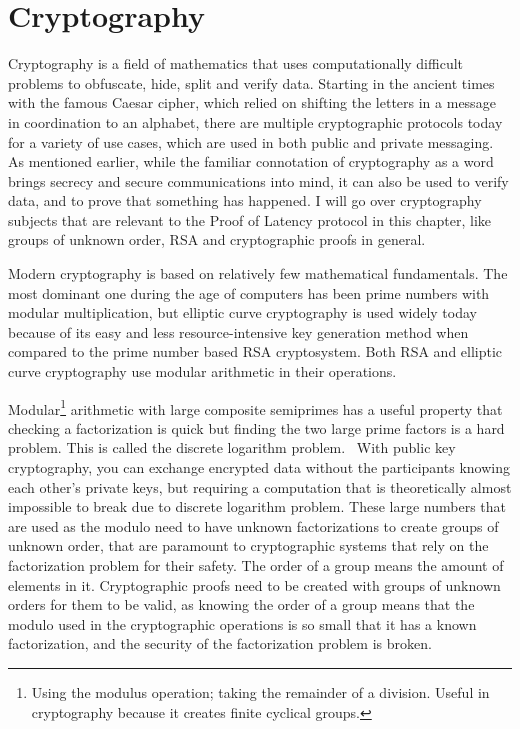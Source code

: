 \section{Cryptography}

Cryptography is a field of mathematics that uses computationally difficult problems to obfuscate, hide, split and verify data. Starting in the ancient times with the famous Caesar cipher, which relied on shifting the letters in a message in coordination to an alphabet, there are multiple cryptographic protocols today for a variety of use cases, which are used in both public and private messaging. As mentioned earlier, while the familiar connotation of cryptography as a word brings secrecy and secure communications into mind, it can also be used to verify data, and to prove that something has happened. I will go over cryptography subjects that are relevant to the Proof of Latency protocol in this chapter, like groups of unknown order, RSA and cryptographic proofs in general.

Modern cryptography is based on relatively few mathematical fundamentals. The most dominant one during the age of computers has been prime numbers with modular multiplication, but elliptic curve cryptography is used widely today because of its easy and less resource-intensive key generation method when compared to the prime number based RSA cryptosystem. Both RSA and elliptic curve cryptography use modular arithmetic in their operations.

Modular\footnote{Using the modulus operation; taking the remainder of a division. Useful in cryptography because it creates finite cyclical groups.} arithmetic with large composite semiprimes has a useful property that checking a factorization is quick but finding the two large prime factors is a hard problem. This is called the discrete logarithm problem.~\cite{Joux2014-rz} With public key cryptography, you can exchange encrypted data without the participants knowing each other's private keys, but requiring a computation that is theoretically almost impossible to break due to discrete logarithm problem. These large numbers that are used as the modulo need to have unknown factorizations to create groups of unknown order, that are paramount to cryptographic systems that rely on the factorization problem for their safety. The order of a group means the amount of elements in it. Cryptographic proofs need to be created with groups of unknown orders for them to be valid, as knowing the order of a group means that the modulo used in the cryptographic operations is so small that it has a known factorization, and the security of the factorization problem is broken.

